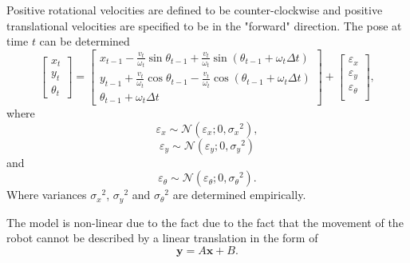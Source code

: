 \documentclass[12pt,oneside,openany,a4paper, %
afrikaans,english,
]{memoir}
\numberwithin{equation}{chapter}
\begin{document}
Positive rotational velocities are defined to be counter-clockwise and positive translational velocities are specified to be in the "forward" direction.
The pose at time $t$ can be determined
\begin{equation}
\begin{bmatrix}
x_t\\
y_t\\
\theta_t
\end{bmatrix}
=
\begin{bmatrix}
x_{t-1} - \frac{v_t}{\omega_t} \sin\theta_{t-1} + \frac{v_t}{\omega_t} \sin(\theta_{t-1} + \omega_t \Delta t)\\
y_{t-1} + \frac{v_t}{\omega_t} \cos\theta_{t-1} - \frac{v_t}{\omega_t} \cos(\theta_{t-1} + \omega_t \Delta t)\\
\theta_{t-1} + \omega_t \Delta t
\end{bmatrix}+
\begin{bmatrix}
\varepsilon_x\\
\varepsilon_y\\
\varepsilon_\theta\\
\end{bmatrix},
\end{equation}
where
\begin{equation}
\varepsilon_x \sim \mathcal{N}(\varepsilon_x; 0, {\sigma_x}^2),
\end{equation}
\begin{equation}
\varepsilon_y \sim \mathcal{N}(\varepsilon_y; 0, {\sigma_y}^2)
\end{equation}
and
\begin{equation}
\varepsilon_\theta \sim \mathcal{N}(\varepsilon_\theta; 0, {\sigma_\theta}^2).
\end{equation}
Where variances ${\sigma_x}^2$, ${\sigma_y}^2$ and ${\sigma_\theta}^2$ are determined empirically.

The model is non-linear due to the fact due to the fact that the movement of the robot cannot be described by a linear translation in the form of
\begin{equation}
\bm{y} = A\bm{x} + B.
\end{equation}
\end{document}

